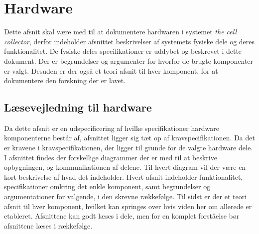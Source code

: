  \section{Hardware}
Dette afsnit skal være med til at dokumentere hardwaren i systemet \textit{the cell collector}, derfor indeholder afsnittet beskrivelser af systemets fysiske dele og deres funktionalitet. De fysiske deles specifikationer er uddybet og beskrevet i dette dokument. Der er begrundelser og argumenter for hvorfor de brugte komponenter er valgt. Desuden er der også et teori afsnit til hver komponent, for at dokumentere den forskning der er lavet.

\subsection{Læsevejledning til hardware}
Da dette afsnit er en udspecificering af hvilke specifikationer hardware komponenterne består af, afsnittet ligger sig tæt op af kravspecifikationen. Da det er kravene i kravspecifikationen, der ligger til grunde for de valgte hardware dele. I afsnittet findes der forskellige diagrammer der er med til at beskrive opbygningen, og kommunikationen af delene. Til hvert diagram vil der være en kort beskrivelse af hvad det indeholder. Hvert afsnit indeholder funktionalitet, specifikationer omkring det enkle komponent, samt begrundelser og argumentationer for valgende, i den skrevne rækkefølge. Til sidst er der et teori afsnit til hver komponent, hvilket kan springes over hvis viden her om allerede er etableret. Afsnittene kan godt læses i dele, men for en komplet forståelse bør afsnittene læses i rækkefølge. 

